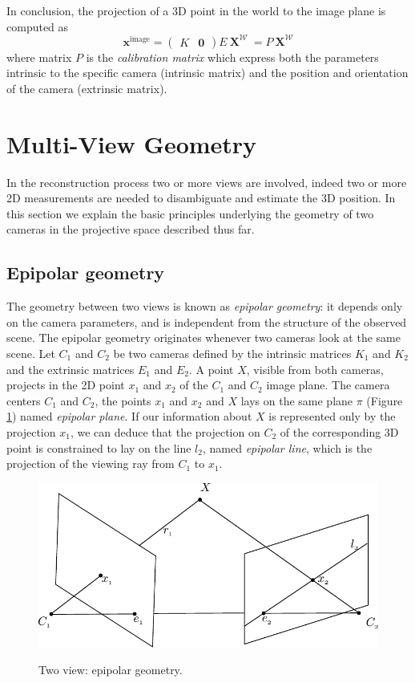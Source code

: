 In conclusion, the projection of a 3D point in the world to the image plane is computed as
\begin{equation}
 \mathbf{x}^{\text{image}}
 = 
\begin{pmatrix}
 K &\mathbf{0}
 \end{pmatrix} 
E
\:
 \mathbf{X}^\mathcal{W}\:=
P
\:
 \mathbf{X}^\mathcal{W}
\end{equation}
where matrix $P$ is the \emph{calibration matrix} which express both the parameters intrinsic to the specific camera (intrinsic matrix) and the position and orientation of the camera (extrinsic matrix).


\section{Multi-View Geometry}
In the reconstruction process two or more views are involved, indeed two or more 2D measurements are needed to disambiguate and estimate the 3D position. 
In this section we explain the basic principles underlying the geometry of two cameras in the projective space described thus far.
\subsection{Epipolar geometry}
The geometry between two views is known as \emph{epipolar geometry}: it depends only on the camera parameters, and is independent from the structure of the observed scene.
The epipolar geometry originates whenever two cameras look at the same scene. 
Let $C_1$ and $C_2$ be two cameras defined by the intrinsic matrices $K_1$ and $K_2$ and the extrinsic matrices $E_1$ and $E_2$.
A point $X$,  visible from both cameras, projects in the 2D point $x_1$ and $x_2$ of the $C_1$ and   $C_2$ image plane.
The camera centers $C_1$ and $C_2$, the points $x_1$ and $x_2$ and $X$ lays on the same plane $\pi$ (Figure \ref{fig:epipolar}) named \emph{epipolar plane}. 
If our information about $X$ is represented only by the projection $x_1$, we can deduce that the projection on $C_2$ of the corresponding 3D point is constrained to lay on the line $l_2$, named \emph{epipolar line}, which is the projection of the viewing ray from $C_1$ to $x_1$.



\begin{figure}[t]
  \includegraphics[width=0.8\columnwidth]{./img/ch-camera/cameraEpipolar}\\
 \caption{Two view: epipolar geometry.}
 \label{fig:epipolar}
\end{figure}
